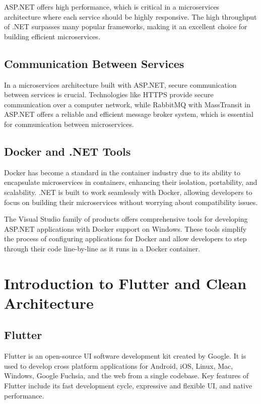 ASP.NET offers high performance, which is critical in a microservices architecture where each service should be highly responsive. The high throughput of .NET surpasses many popular frameworks, making it an excellent choice for building efficient microservices.
\subsection{Communication Between Services}
In a microservices architecture built with ASP.NET, secure communication between services is crucial. Technologies like HTTPS provide secure communication over a computer network, while RabbitMQ with MassTransit in ASP.NET offers a reliable and efficient message broker system, which is essential for communication between microservices.

\subsection{Docker and .NET Tools}
Docker has become a standard in the container industry due to its ability to encapsulate microservices in containers, enhancing their isolation, portability, and scalability. .NET is built to work seamlessly with Docker, allowing developers to focus on building their microservices without worrying about compatibility issues.

The Visual Studio family of products offers comprehensive tools for developing ASP.NET applications with Docker support on Windows.
These tools simplify the process of configuring applications for Docker and allow developers to step through their code line-by-line as it runs in a Docker container.
\section{Introduction to Flutter and Clean Architecture}
\subsection{Flutter}
Flutter is an open-source UI software development kit created by Google. It is used to develop cross platform applications for Android, iOS, Linux, Mac, Windows, Google Fuchsia, and the web from a single codebase. Key features of Flutter include its fast development cycle, expressive and flexible UI, and native performance.
